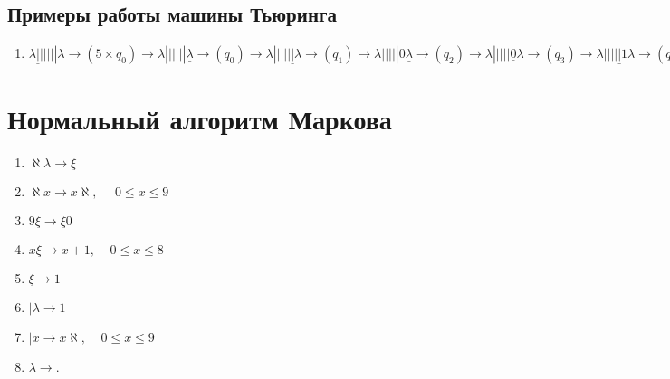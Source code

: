 \documentclass[titlepage,paper=a4,pagesize,draft]{scrartcl}
\begin{document}
\subsection{Примеры работы машины Тьюринга}
\begin{enumerate}
\item $\lambda\underline||||||\lambda\rightarrow(5\times q_0)\rightarrow\lambda||||||\underline\lambda\rightarrow(q_0)\rightarrow\lambda|||||\underline|\lambda\rightarrow(q_1)\rightarrow\lambda|||||0\underline\lambda\rightarrow(q_2)\rightarrow\lambda|||||\underline0\lambda\rightarrow(q_3)\rightarrow\lambda||||\underline|1\lambda\rightarrow(q_1)\rightarrow\lambda||||0\underline1\lambda\rightarrow(q_2)\rightarrow\lambda||||01\underline\lambda\rightarrow(q_2)\rightarrow\lambda||||0\underline1\lambda\rightarrow(q_3)\rightarrow\lambda||||\underline02\lambda\rightarrow(q_1)\rightarrow\lambda|||\underline|02\lambda\rightarrow(q_1)\rightarrow\lambda|||0\underline02\lambda\rightarrow(2\times q_2)\rightarrow\lambda|||002\underline\lambda\rightarrow(q_2)\rightarrow\lambda|||00\underline2\lambda\rightarrow(q_3)\rightarrow\lambda|||0\underline03\lambda\rightarrow(2\times q_1)\rightarrow\lambda||\underline|003\lambda\rightarrow(q_1)\rightarrow\lambda||0\underline003\lambda\rightarrow(3\times q_2)\rightarrow\lambda||0003\underline\lambda\rightarrow(q_2)\rightarrow\lambda||000\underline3\lambda\rightarrow(q_3)\rightarrow\lambda||00\underline04\lambda\rightarrow(3\times q_1)\rightarrow\lambda|\underline|0004\lambda\rightarrow(q_1)\rightarrow\lambda|0\underline0004\lambda\rightarrow(4\times q_2)\rightarrow\lambda|00004\underline\lambda\rightarrow(q_2)\rightarrow\lambda|0000\underline4\lambda\rightarrow(q_3)\rightarrow\lambda|000\underline05\lambda\rightarrow(4\times q_1)\rightarrow\lambda\underline|00005\lambda\rightarrow(q_2)\rightarrow\lambda0\underline00005\lambda\rightarrow(5\times q_2)\rightarrow\lambda000005\underline\lambda\rightarrow(q_2)\rightarrow\lambda00000\underline5\lambda\rightarrow(q_3)\rightarrow\lambda0000\underline06\lambda\rightarrow(5\times q_1)\rightarrow\underline\lambda000006\lambda\rightarrow(q_1)\rightarrow\lambda\underline000006\lambda\rightarrow(5\times q_0)\rightarrow\lambda\lambda\lambda\lambda\lambda\lambda\underline6\lambda\rightarrow(q_0)\rightarrow\lambda6\lambda$
\end{enumerate}

\section{Нормальный алгоритм Маркова}
\begin{enumerate}
\item $\aleph\lambda\rightarrow\xi$
\item $\aleph x\rightarrow x\aleph, ~~~~~~0\leqslant x\leqslant9$
\item $9\xi\rightarrow\xi0$
\item $x\xi\rightarrow x+1, ~~~~~0\leqslant x\leqslant8$
\item $\xi\rightarrow1$
\item $|\lambda\rightarrow1$
\item $|x\rightarrow x\aleph, ~~~~~0\leqslant x\leqslant9$
\item $\lambda\rightarrow.$
\end{enumerate}
\end{document}
